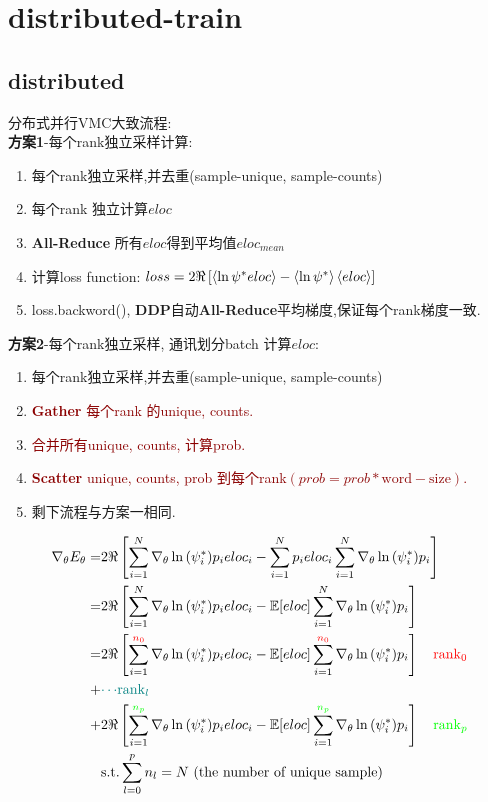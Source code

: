 \section{distributed-train}
\subsection{distributed}
\noindent 分布式并行VMC大致流程:\\
\textbf{方案1}-每个rank独立采样计算:
\begin{enumerate}
    \item 每个rank独立采样,并去重(sample-unique, sample-counts)
    \item 每个rank 独立计算$eloc$
    \item \textbf{All-Reduce} 所有$eloc$得到平均值$eloc_{mean}$
    \item 计算loss function: $loss = 2\Re\left[\braket{\ln\psi^* eloc } -\braket{\ln\psi^*}\braket{eloc}\right]$
    \item loss.backword(), \textbf{DDP}自动\textbf{All-Reduce}平均梯度,保证每个rank梯度一致.
\end{enumerate}
\textbf{方案2}-每个rank独立采样, 通讯划分batch 计算$eloc$:
\begin{enumerate}
    \item 每个rank独立采样,并去重(sample-unique, sample-counts)
    \item \textcolor{darkred}{\textbf{Gather} 每个rank 的unique, counts.}
    \item \textcolor{darkred}{合并所有unique, counts, 计算prob.}
    \item \textcolor{darkred}{\textbf{Scatter} unique, counts, prob 到每个rank$(prob = prob * \mathrm{word-size})$.}
    \item 剩下流程与方案一相同.
\end{enumerate}
\begin{equation}
    \begin{split}
        \nabla_{\theta} E_{\theta} =& 2\Re\left[\sum_{i=1}^N \nabla_{\theta}\ln{(\psi_i^*)} p_i eloc_i -
            \sum_{i=1}^N p_i eloc_i \sum_{i=1}^{N}\nabla_{\theta}\ln{(\psi_i^*)}p_i\right] \\
        = &2 \Re\left[\sum_{i=1}^N \nabla_{\theta}\ln{(\psi_i^*)} p_i eloc_i -
            \mathbb{E}[eloc] \sum_{i=1}^{N}\nabla_{\theta}\ln{(\psi_i^*)}p_i\right] \\
        = &2 \Re\left[\sum_{i=1}^{\textcolor{red}{n_0}} \nabla_{\theta}\ln{(\psi_i^*)} p_i eloc_i -
            \mathbb{E}[eloc] \sum_{i=1}^{\textcolor{red}{n_0}}\nabla_{\theta}\ln{(\psi_i^*)}p_i\right]
             \quad \textcolor{red}{\mathrm{rank}_0} \\
        + & \textcolor{teal}{\cdots}\textcolor{teal}{\mathrm{rank}_l} \\
        + & 2\Re\left[\sum_{i=1}^{\textcolor{green}{n_p}} \nabla_{\theta}\ln{(\psi_i^*)} p_i eloc_i -
            \mathbb{E}[eloc] \sum_{i=1}^{\textcolor{green}{n_p}}\nabla_{\theta}\ln{(\psi_i^*)}p_i\right]
            \quad \textcolor{green}{\mathrm{rank}_p}\\
        &\mathrm{ s.t. } \sum_{l=0}^{p}n_l = N \ \textnormal{(the number of unique sample)}
    \end{split}
\end{equation}
